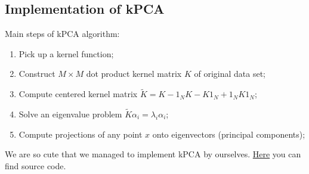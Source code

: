 \subsection{Implementation of kPCA}
Main steps of kPCA algorithm:
\begin{enumerate}
	\item Pick up a kernel function;
	\item Construct $M \times M$ dot product kernel matrix $K$ of original data set;
	\item Compute centered kernel matrix $\widetilde{K} = K - 1_NK - K1_N + 1_NK1_N$;
	\item Solve an eigenvalue problem $\widetilde{K}\alpha_i = \lambda_i\alpha_i$;
	\item Compute projections of any point $x$ onto eigenvectors (principal components);
\end{enumerate}
We are so cute that we managed to implement kPCA by ourselves. \href{https://github.com/Irynei/KernelPCA}{Here} you can find source code.

